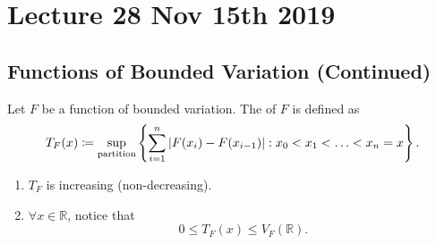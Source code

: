 \documentclass[notoc,notitlepage]{tufte-book}
\begin{document}


\chapter{Lecture 28 Nov 15th 2019}%
\label{chp:lecture_28_nov_15th_2019}

\section{Functions of Bounded Variation (Continued)}%
\label{sec:functions_of_bounded_variation_continued}

\begin{defn}\label{defn:total_variation}
  Let $F$ be a function of bounded variation.
  The  of $F$ is defined as
  \begin{equation*}
    T_F(x) \coloneqq \sup_{\text{partition}} \left\{ 
      \sum_{i=1}^{n} \left|F(x_i) - F(x_{i-1})\right| : x_0 < x_1 < \hdots < x_n = x
    \right\}.
  \end{equation*}
\end{defn}

\begin{remark}
  \begin{enumerate}
    \item $T_F$ is increasing (non-decreasing).
    \item $\forall x \in \mathbb{R}$, notice that
      \begin{equation*}
        0 \leq T_F(x) \leq V_F(\mathbb{R}).
      \end{equation*}
  \end{enumerate}
\end{remark}
\end{document}
